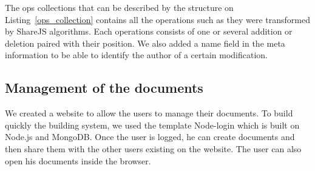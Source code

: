 \documentclass{llncs}
\begin{document}

The ops collections that can be described by the structure on
Listing~\ref{ops_collection} contains all the operations such as they were
transformed by ShareJS algorithms. Each operations consists of one or several
addition or deletion paired with their position. We also added a name field in
the meta information to be able to identify the author of a certain
modification.
%

\subsection{Management of the documents}

We created a website to allow the users to manage their documents.
To build quickly the building system, we used the template Node-login which is built
on Node.js and MongoDB.
Once the user is logged, he can create documents and then share them with the other
users existing on the website. The user can also open his documents inside the browser.
\end{document}
